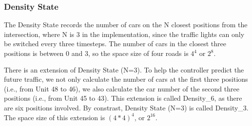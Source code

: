 \subsubsection{Density State}
The Density State records the number of cars on the N closest positions from the intersection, where N is 3 in the implementation, since the traffic lights can only be switched every three timesteps. The number of cars in the closest three positions is between 0 and 3, so the space size of four roads is $4^4$ or $2^8$.

There is an extension of Density State (N=3). To help the controller predict the future traffic, we not only calculate the number of cars at the first three positions (i.e., from Unit 48 to 46), we also calculate the car number of the second three positions (i.e., from Unit 45 to 43). This extension is called Density\_6, as there are six positions involved. By constrast, Density State (N=3) is called Density\_3. The space size of this extension is $(4 * 4) ^{4}$, or $2^{16}$.